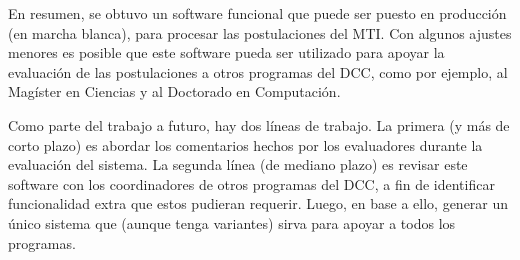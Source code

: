 \begin{conclusion}
	En resumen, se obtuvo un software funcional que puede ser puesto en
	producción (en marcha blanca), para procesar las postulaciones del MTI. Con
	algunos ajustes menores es posible que este software pueda ser utilizado
	para apoyar la evaluación de las postulaciones a otros programas del DCC,
	como por ejemplo, al Magíster en Ciencias y al Doctorado en Computación.

	Como parte del trabajo a futuro, hay dos líneas de trabajo. La primera (y
	más de corto plazo) es abordar los comentarios hechos por los evaluadores
	durante la evaluación del sistema. La segunda línea (de mediano plazo) es
	revisar este software con los coordinadores de otros programas del DCC, a
	fin de identificar funcionalidad extra que estos pudieran requerir. Luego,
	en base a ello, generar un único sistema que (aunque tenga variantes) sirva
	para apoyar a todos los programas.


	
\end{conclusion}
